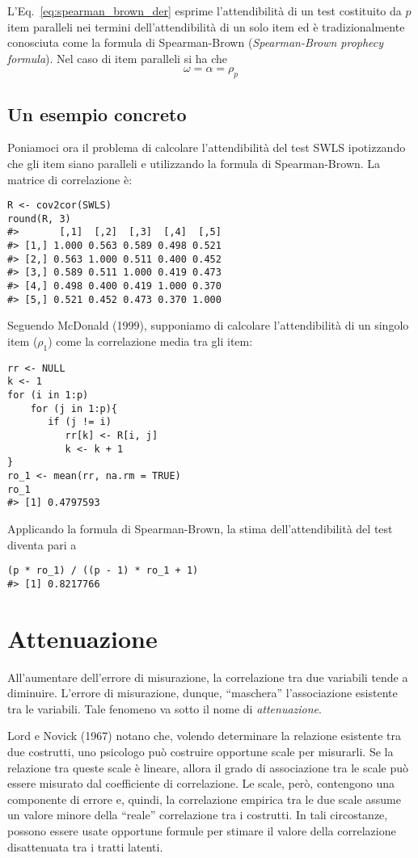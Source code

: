 L'Eq.~\ref{eq:spearman_brown_der} esprime l'attendibilità di un test costituito da $p$ item paralleli nei termini dell'attendibilità di un solo item ed è tradizionalmente conosciuta come la formula di Spearman-Brown ({\it Spearman-Brown prophecy formula}).
Nel caso di item paralleli si ha che
\begin{equation}
  \omega=\alpha=\rho_p
\end{equation}

\subsection{Un esempio concreto}

Poniamoci ora il problema di calcolare  l'attendibilità del test SWLS ipotizzando che gli item siano paralleli e utilizzando la formula di Spearman-Brown. 
La matrice di correlazione è: 

\begin{lstlisting}
R <- cov2cor(SWLS)
round(R, 3) 
#>       [,1]  [,2]  [,3]  [,4]  [,5] 
#> [1,] 1.000 0.563 0.589 0.498 0.521 
#> [2,] 0.563 1.000 0.511 0.400 0.452
#> [3,] 0.589 0.511 1.000 0.419 0.473 
#> [4,] 0.498 0.400 0.419 1.000 0.370 
#> [5,] 0.521 0.452 0.473 0.370 1.000
\end{lstlisting}
Seguendo McDonald (1999), supponiamo di calcolare l'attendibilità di un singolo item ($\rho_1$) come la correlazione media tra gli item: 
\medskip
\begin{lstlisting}
rr <- NULL 
k <- 1 
for (i in 1:p) 
    for (j in 1:p){ 
       if (j != i)
          rr[k] <- R[i, j] 
          k <- k + 1 
} 
ro_1 <- mean(rr, na.rm = TRUE)
ro_1 
#> [1] 0.4797593
\end{lstlisting}
Applicando la formula di Spearman-Brown, la stima dell'attendibilità del test diventa pari a 
\medskip
\begin{lstlisting}
(p * ro_1) / ((p - 1) * ro_1 + 1) 
#> [1] 0.8217766
\end{lstlisting}

\section{Attenuazione}

All'aumentare dell'errore di misurazione, la correlazione tra due variabili tende a diminuire. L'errore di misurazione, dunque, ``maschera'' l'associazione esistente tra le variabili. Tale fenomeno va sotto il nome di \emph{attenuazione}. 

Lord e Novick (1967) notano che, volendo determinare la relazione
esistente tra due costrutti,  uno psicologo può costruire opportune
scale per misurarli. Se la relazione tra queste scale è lineare,
allora il grado di associazione tra le scale può essere misurato dal
coefficiente di correlazione. Le scale, però, contengono una
componente di errore e, quindi, la correlazione empirica tra le due
scale assume un valore minore della ``reale'' correlazione tra i costrutti.  
In tali circostanze, possono essere usate opportune formule per stimare il valore della correlazione disattenuata tra i tratti latenti.


